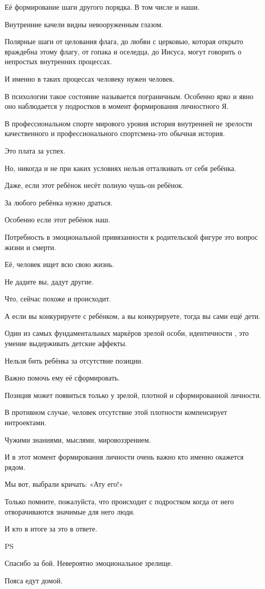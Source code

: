 Её формирование шаги другого порядка. В том числе и наши.

Внутренние качели видны невооруженным глазом.

Полярные шаги от целования флага, до любви с церковью, которая открыто
враждебна этому флагу, от гопака и оселедца, до Иисуса, могут говорить о
непростых внутренних процессах.

И именно в таких процессах человеку нужен человек.

В психологии такое состояние называется пограничным. Особенно ярко и явно оно
наблюдается у подростков в момент формирования личностного Я.

В профессиональном спорте мирового уровня история внутренней не зрелости
качественного и профессионального спортсмена-это обычная история. 

Это плата за успех.

Но, никогда и не при каких условиях нельзя отталкивать от себя ребёнка.

Даже, если этот ребёнок несёт полную чушь-он ребёнок.

За любого ребёнка нужно драться. 

Особенно если этот ребёнок наш.

Потребность в эмоциональной привязанности к родительской фигуре это вопрос
жизни и смерти. 

Её, человек ищет всю свою жизнь.

Не дадите вы, дадут другие.

Что, сейчас похоже и происходит.

А если вы конкурируете с ребёнком, а вы конкурируете, тогда вы сами ещё дети.

Один из самых фундаментальных маркёров зрелой особи,  идентичности , это умение
выдерживать детские аффекты.

Нельзя бить ребёнка за отсутствие позиции. 

Важно помочь ему её сформировать. 

Позиция может появиться только у зрелой, плотной и сформированной личности.

В противном случае, человек отсутствие этой плотности компенсирует интроектами.

Чужими знаниями, мыслями, мировоззрением.

И в этот момент формирования личности очень важно кто именно окажется рядом.

Мы вот, выбрали кричать: «Ату его!»

Только помните, пожалуйста, что происходит с подростком когда от него
отворачиваются значимые для него люди.

И кто в итоге за это в ответе.

PS

Спасибо за бой. Невероятно эмоциональное зрелище.

Пояса едут домой.

